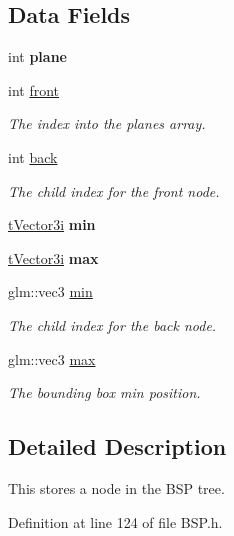 \subsection*{Data Fields}
\begin{DoxyCompactItemize}
\item 
int {\bfseries plane}\hypertarget{structt_b_s_p_node_acae9ab0c244841538b7042374cc7badc}{}\label{structt_b_s_p_node_acae9ab0c244841538b7042374cc7badc}

\item 
int \hyperlink{structt_b_s_p_node_a8e8f05774c8c65b46a9a89418d0347d4}{front}\hypertarget{structt_b_s_p_node_a8e8f05774c8c65b46a9a89418d0347d4}{}\label{structt_b_s_p_node_a8e8f05774c8c65b46a9a89418d0347d4}

\begin{DoxyCompactList}\small\item\em The index into the planes array. \end{DoxyCompactList}\item 
int \hyperlink{structt_b_s_p_node_a814838f175570662e13bdb184039f8a1}{back}\hypertarget{structt_b_s_p_node_a814838f175570662e13bdb184039f8a1}{}\label{structt_b_s_p_node_a814838f175570662e13bdb184039f8a1}

\begin{DoxyCompactList}\small\item\em The child index for the front node. \end{DoxyCompactList}\item 
\hyperlink{structt_vector3i}{t\+Vector3i} {\bfseries min}\hypertarget{structt_b_s_p_node_a803a817ecea71b6713d42169e5ee8a1f}{}\label{structt_b_s_p_node_a803a817ecea71b6713d42169e5ee8a1f}

\item 
\hyperlink{structt_vector3i}{t\+Vector3i} {\bfseries max}\hypertarget{structt_b_s_p_node_a079da40ca10a9c458312eb3941de8112}{}\label{structt_b_s_p_node_a079da40ca10a9c458312eb3941de8112}

\item 
glm\+::vec3 \hyperlink{structt_b_s_p_node_a409af63ecc6a4b7524e7c3f578bcae58}{min}\hypertarget{structt_b_s_p_node_a409af63ecc6a4b7524e7c3f578bcae58}{}\label{structt_b_s_p_node_a409af63ecc6a4b7524e7c3f578bcae58}

\begin{DoxyCompactList}\small\item\em The child index for the back node. \end{DoxyCompactList}\item 
glm\+::vec3 \hyperlink{structt_b_s_p_node_a883eb4f441271d833d2f8ab8a65559c1}{max}\hypertarget{structt_b_s_p_node_a883eb4f441271d833d2f8ab8a65559c1}{}\label{structt_b_s_p_node_a883eb4f441271d833d2f8ab8a65559c1}

\begin{DoxyCompactList}\small\item\em The bounding box min position. \end{DoxyCompactList}\end{DoxyCompactItemize}


\subsection{Detailed Description}
This stores a node in the B\+SP tree. 

Definition at line 124 of file B\+S\+P.\+h.

